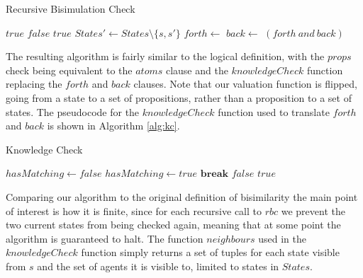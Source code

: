 \begin{algorithm}
\caption{Recursive Bisimulation Check}
\label{alg:rbc}
\begin{algorithmic}[H]
		\State\Return $true$
		\State\Return $false$
		\State\Return $true$
	\Else
		\State $States' \gets States \setminus \{s,s'\}$
		\State $forth \gets$ 
		\State $back \gets$ 
		\State \Return $(forth \ and \ back)$
	\EndIf
\EndFunction
\end{algorithmic}
\end{algorithm}

The resulting algorithm is fairly similar to the logical definition, with the $props$ check being equivalent to the $atoms$ clause and the $knowledgeCheck$ function replacing the $forth$ and $back$ clauses. Note that our valuation function is flipped, going from a state to a set of propositions, rather than a proposition to a set of states. The pseudocode for the $knowledgeCheck$ function used to translate $forth$ and $back$ is shown in Algorithm \ref{alg:kc}.

\begin{algorithm}
\caption{Knowledge Check}
\label{alg:kc}
\begin{algorithmic}
			\State $hasMatching \gets false$
					\State $hasMatching \gets true$
					\State $\mathbf{break}$
				\EndIf
			\EndFor
				\State\Return $false$
			\EndIf
		\EndFor	
	\EndFor
	\State \Return $true$ 
\EndFunction
\end{algorithmic}
\end{algorithm}

Comparing our algorithm to the original definition of bisimilarity the main point of interest is how it is finite, since for each recursive call to $rbc$ we prevent the two current states from being checked again, meaning that at some point the algorithm is guaranteed to halt. The function $neighbours$ used in the $knowledgeCheck$ function simply returns a set of tuples for each state visible from $s$ and the set of agents it is visible to, limited to states in $States$.

